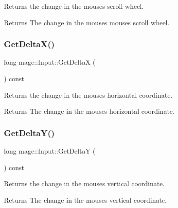 Returns the change in the mouse\textquotesingle{}s scroll wheel.

\begin{DoxyReturn}{Returns}
The change in the mouse\textquotesingle{}s mouse\textquotesingle{}s scroll wheel. 
\end{DoxyReturn}
\hypertarget{classmage_1_1_input_a6fcfe61fc9f5a2575375c7e2c39507f5}{}\label{classmage_1_1_input_a6fcfe61fc9f5a2575375c7e2c39507f5} 
\subsubsection{\texorpdfstring{Get\+Delta\+X()}{GetDeltaX()}}
{\footnotesize\ttfamily long mage\+::\+Input\+::\+Get\+DeltaX (\begin{DoxyParamCaption}{ }\end{DoxyParamCaption}) const}

Returns the change in the mouse\textquotesingle{}s horizontal coordinate.

\begin{DoxyReturn}{Returns}
The change in the mouse\textquotesingle{}s horizontal coordinate. 
\end{DoxyReturn}
\hypertarget{classmage_1_1_input_ac63b55db4438989d2c6729a358ace296}{}\label{classmage_1_1_input_ac63b55db4438989d2c6729a358ace296} 
\subsubsection{\texorpdfstring{Get\+Delta\+Y()}{GetDeltaY()}}
{\footnotesize\ttfamily long mage\+::\+Input\+::\+Get\+DeltaY (\begin{DoxyParamCaption}{ }\end{DoxyParamCaption}) const}

Returns the change in the mouse\textquotesingle{}s vertical coordinate.

\begin{DoxyReturn}{Returns}
The change in the mouse\textquotesingle{}s vertical coordinate. 
\end{DoxyReturn}
\hypertarget{classmage_1_1_input_a3d944c0dc60299561e6eb135f0494743}{}\label{classmage_1_1_input_a3d944c0dc60299561e6eb135f0494743} 

